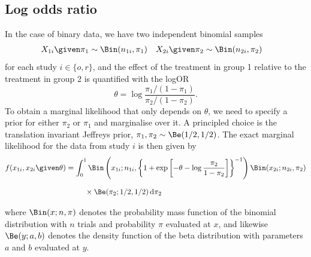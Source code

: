 \subsection{Log odds ratio}
In the case of binary data, we have two independent binomial samples
\begin{align*}
  &X_{1i} \given \pi_1 \sim \Bin(n_{1i}, \pi_1)&
  &X_{2i} \given \pi_2 \sim \Bin(n_{2i}, \pi_2)&
\end{align*}
for each study $i \in \{o, r\}$, and the effect of the treatment in group 1
relative to the treatment in group 2 is quantified with the logOR
$$\theta = \log \frac{\pi_1/(1 - \pi_1)}{\pi_2/(1 - \pi_2)}.$$
To obtain a marginal likelihood that only depends on $\theta$, we need to
specify a prior for either $\pi_2$ or $\pi_1$ and marginalise over it. A
principled choice is the translation invariant Jeffreys prior,
$\pi_1, \pi_2 \sim \Be(1/2, 1/2)$. The exact marginal likelihood for the data
from study $i$ is then given by
\begin{align}
  \label{eq:binexact}
  f(x_{1i}, x_{2i} \given \theta)
  &= \int_0^1 \Bin\left(x_{1i}; n_{1i}, \left\{1 + \exp\left[-\theta - \log
    \frac{\pi_2}{1 - \pi_2}\right]\right\}^{-1}\right) \Bin(x_{2i}; n_{2i}, \pi_2)
  \nonumber
  \\ &\phantom{= \int_0^1}  \times \Be(\pi_2; 1/2, 1/2) \, \text{d} \pi_2
\end{align}
where $\Bin(x; n, \pi)$ denotes the probability mass function of the binomial
distribution with $n$ trials and probability $\pi$ evaluated at $x$, and
likewise $\Be(y; a, b)$ denotes the density function of the beta distribution
with parameters $a$ and $b$ evaluated at $y$.

